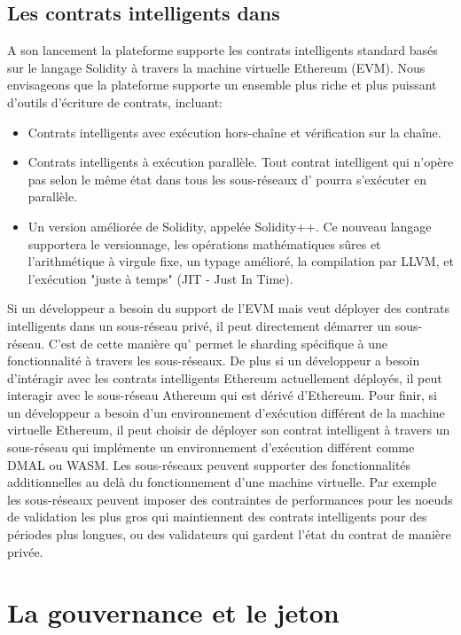 \documentclass[runningheads]{llncs}
\begin{document}
\subsection{Les contrats intelligents dans \AVATokenName}
A son lancement la plateforme \AVAPlatformName{} supporte les contrats intelligents standard basés sur le langage
Solidity à travers la machine virtuelle Ethereum (EVM). Nous envisageons que la plateforme supporte un ensemble plus
riche et plus puissant d'outils d'écriture de contrats, incluant:
\begin{itemize}
\item Contrats intelligents avec exécution hors-chaîne et vérification sur la chaîne.
\item Contrats intelligents à exécution parallèle. Tout contrat intelligent qui n'opère pas selon le même état dans tous
les sous-réseaux d'\AVAPlatformName{} pourra s'exécuter en parallèle.
\item Un version améliorée de Solidity, appelée Solidity++. Ce nouveau langage supportera le versionnage, les opérations
mathématiques sûres et l'arithmétique à virgule fixe, un typage amélioré, la compilation par LLVM, et l'exécution
"juste à temps" (JIT - Just In Time).
\end{itemize}

Si un développeur a besoin du support de l'EVM mais veut déployer des contrats intelligents dans un sous-réseau privé,
il peut directement démarrer un sous-réseau. C'est de cette manière qu'\AVAPlatformName{} permet le sharding spécifique
à une fonctionnalité à travers les sous-réseaux. De plus si un développeur a besoin d'intéragir avec les contrats
intelligents Ethereum actuellement déployés, il peut interagir avec le sous-réseau Athereum qui est dérivé d'Ethereum.
Pour finir, si un développeur a besoin d'un environnement d'exécution différent de la machine virtuelle Ethereum, il peut
choisir de déployer son contrat intelligent à travers un sous-réseau qui implémente un environnement d'exécution
différent comme DMAL ou WASM. Les sous-réseaux peuvent supporter des fonctionnalités additionnelles au delà du
fonctionnement d'une machine virtuelle. Par exemple les sous-réseaux peuvent imposer des contraintes de performances
pour les noeuds de validation les plus gros qui maintiennent des contrats intelligents pour des périodes plus longues,
ou des validateurs qui gardent l'état du contrat de manière privée.

\section{La gouvernance et le jeton \AVATokenName{}}
\label{section:governance_and_token}
\end{document}
